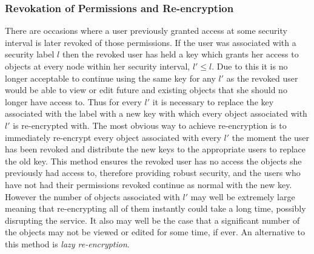 \documentclass[10pt, titlepage]{article}
\begin{document}
\subsubsection{Revokation of Permissions and Re-encryption}
There are occasions where a user previously granted access at some security interval is later revoked of those permissions. If the user was associated with a security label $l$ then the revoked user has held a key which grants her access to objects at every node within her security interval, $l' \le l$. Due to this it is no longer acceptable to continue using the same key for any $l'$ as the revoked user would be able to view or edit future and existing objects that she should no longer have access to. Thus for every $l'$ it is necessary to replace the key associated with the label with a new key with which every object associated with $l'$ is re-encrypted with.
\newline \indent The most obvious way to achieve re-encryption is to immediately re-encrypt every object associated with every $l'$ the moment the user has been revoked and distribute the new keys to the appropriate users to replace the old key. This method ensures the revoked user has no access the objects she previously had access to, therefore providing robust security, and the users who have not had their permissions revoked continue as normal with the new key. However the number of objects associated with $l'$ may well be extremely large meaning that re-encrypting all of them instantly could take a long time, possibly disrupting the service. It also may well be the case that a significant number of the objects may not be viewed or edited for some time, if ever. An alternative to this method is \textit{lazy re-encryption}.
\end{document}
